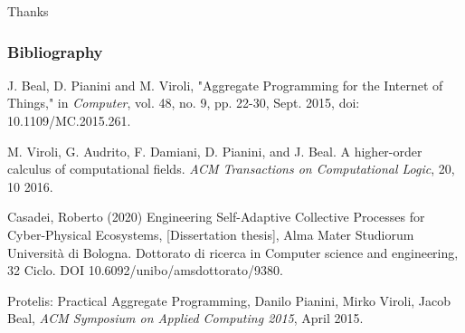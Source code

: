\begin{frame}
\centering
\Huge Thanks
\end{frame}

\begin{frame}
\frametitle{Bibliography}
J. Beal, D. Pianini and M. Viroli, "Aggregate Programming for the Internet of Things," in \textit{Computer}, vol. 48, no. 9, pp. 22-30, Sept. 2015, doi: 10.1109/MC.2015.261.

\medskip

M. Viroli, G. Audrito, F. Damiani, D. Pianini, and J. Beal. A higher-order calculus of computational fields. \textit{ACM Transactions on Computational Logic}, 20, 10 2016.

\medskip

Casadei, Roberto  (2020) Engineering Self-Adaptive Collective Processes for Cyber-Physical Ecosystems, [Dissertation thesis], Alma Mater Studiorum Università di Bologna.  Dottorato di ricerca in Computer science and engineering, 32 Ciclo. DOI 10.6092/unibo/amsdottorato/9380.

\medskip

Protelis: Practical Aggregate Programming, Danilo Pianini, Mirko Viroli, Jacob Beal, \textit{ACM Symposium on Applied Computing 2015}, April 2015.
\end{frame}


